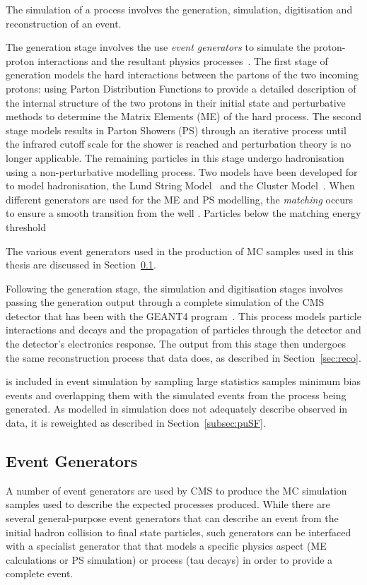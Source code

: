 The simulation of a process involves the generation, simulation, digitisation and reconstruction of an event.

The generation stage involves the use \emph{event generators} to simulate the proton-proton interactions and the resultant physics processes~\cite{Buckley:2011ms,Hoche:2014rga}.
The first stage of generation models the hard interactions between the partons of the two incoming protons: using Parton Distribution Functions to provide a detailed description of the internal structure of the two protons in their initial state and perturbative methods to determine the Matrix Elements (ME) of the hard process.
The second stage models results in Parton Showers (PS) through an iterative process until the infrared cutoff scale for the shower is reached and perturbation theory is no longer applicable.
The remaining particles in this stage undergo hadronisation using a non-perturbative modelling process.
Two models have been developed for to model hadronisation, the Lund String Model~\cite{Andersson:1983ia} and the Cluster Model~\cite{Winter:2003tt}.
When different generators are used for the ME and PS modelling, the \emph{matching} occurs to ensure a smooth transition from the well .
Particles below the matching energy threshold


The various event generators used in the production of MC samples used in this thesis are discussed in Section~\ref{subsec:eventGenerators}.

Following the generation stage, the simulation and digitisation stages involves passing the generation output through a complete simulation of the CMS detector that has been with the GEANT4 program~\cite{geant4,Lefebure:1999wja}.
This process models particle interactions and decays and the propagation of particles through the detector and the detector's electronics response.
The output from this stage then undergoes the same reconstruction process that data does, as described in Section~\ref{sec:reco}.

\PU is included in event simulation by sampling large statistics samples minimum bias events and overlapping them with the simulated events from the process being generated.
As \PU modelled in simulation does not adequately describe observed \PU in data, it is reweighted as described in Section~\ref{subsec:puSF}.

\subsection{Event Generators}\label{subsec:eventGenerators}
A number of event generators are used by CMS to produce the MC simulation samples used to describe the expected processes produced.
While there are several general-purpose event generators that can describe an event from the initial hadron collision to final state particles, such generators can be interfaced with a specialist generator that that models a specific physics aspect (\ie ME calculations or PS simulation) or process (\eg tau decays) in order to provide a complete event.


